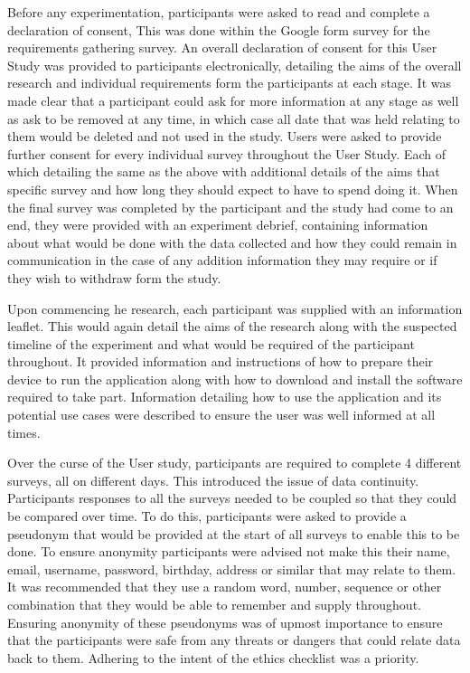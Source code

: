 \documentclass{l4proj}
\begin{document}
Before any experimentation, participants were asked to read and complete a declaration of consent, This was done within the Google form survey for the requirements gathering survey. An overall declaration of consent for this User Study was provided to participants electronically, detailing the aims of the overall research and individual requirements form the participants at each stage. It was made clear that a participant could ask for more information at any stage as well as ask to be removed at any time, in which case all date that was held relating to them would be deleted and not used in the study. Users were asked to provide further consent for every individual survey throughout the User Study. Each of which detailing the same as the above with additional details of the aims that specific survey and how long they should expect to have to spend doing it. When the final survey was completed by the participant and the study had come to an end, they were provided with an experiment debrief, containing information about what would be done with the data collected and how they could remain in communication in the case of any addition information they may require or if they wish to withdraw form the study. 

Upon commencing he research, each participant was supplied with an information leaflet. This would again detail the aims of the research along with the suspected timeline of the experiment and what would be required of the participant throughout. It provided information and instructions of how to prepare their device to run the application along with how to download and install the software required to take part. Information detailing how to use the application and its potential use cases were described to ensure the user was well informed at all times. 

Over the curse of the User study, participants are required to complete 4 different surveys, all on different days. This introduced the issue of data continuity. Participants responses to all the surveys needed to be coupled so that they could be compared over time. To do this, participants were asked to provide a pseudonym that would be provided at the start of all surveys to enable this to be done. To ensure anonymity participants were advised not make this their name, email, username, password, birthday, address or similar that may relate to them. It was recommended that they use a random word, number, sequence or other combination that they would be able to remember and supply throughout. Ensuring anonymity of these pseudonyms was of upmost importance to ensure that the participants were safe from any threats or dangers that could relate data back to them. Adhering to the intent of the ethics checklist was a priority.
\end{document}
